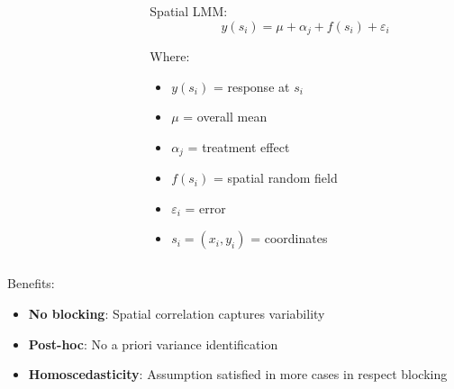 \documentclass[aspectratio=43]{beamer}
\begin{document}
\begin{frame}
\begin{columns}
\begin{column}{0.65\textwidth}
\begin{center}
            \end{center}
        \end{column}
        
        \begin{column}{0.35\textwidth}
            \begin{block}{\small Spatial LMM:}
                \begin{equation*}
                    y(s_i) = \mu + \alpha_j + f(s_i) + \varepsilon_i
                \end{equation*}
                
                \scriptsize
                Where:
                \begin{itemize}
                    \item $y(s_i)$ = response at $s_i$
                    \item $\mu$ = overall mean
                    \item $\alpha_j$ = treatment effect
                    \item $f(s_i)$ = spatial random field
                    \item $\varepsilon_i$ = error
                    \item $s_i = (x_i, y_i)$  = coordinates
                \end{itemize}
            \end{block}
            
        \end{column}
    \end{columns}
    
    \begin{exampleblock}{\scriptsize Benefits:}
        \tiny
        \begin{itemize}
            \item \textbf{No blocking}: Spatial correlation captures variability
            \item \textbf{Post-hoc}: No a priori variance identification
            \item \textbf{Homoscedasticity}: Assumption satisfied in more cases in respect blocking
        \end{itemize}
    \end{exampleblock}
\end{frame}
\end{document}

